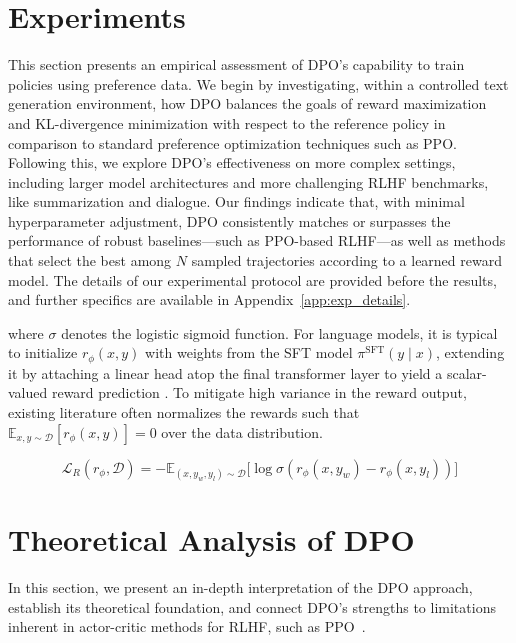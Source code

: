 \section{Experiments}
This section presents an empirical assessment of DPO’s capability to train policies using preference data. We begin by investigating, within a controlled text generation environment, how DPO balances the goals of reward maximization and KL-divergence minimization with respect to the reference policy in comparison to standard preference optimization techniques such as PPO. Following this, we explore DPO’s effectiveness on more complex settings, including larger model architectures and more challenging RLHF benchmarks, like summarization and dialogue. Our findings indicate that, with minimal hyperparameter adjustment, DPO consistently matches or surpasses the performance of robust baselines—such as PPO-based RLHF—as well as methods that select the best among $N$ sampled trajectories according to a learned reward model. The details of our experimental protocol are provided before the results, and further specifics are available in Appendix~\ref{app:exp_details}.

where $\sigma$ denotes the logistic sigmoid function. For language models, it is typical to initialize $r_{\phi}(x, y)$ with weights from the SFT model $\pi^\text{SFT}(y \mid x)$, extending it by attaching a linear head atop the final transformer layer to yield a scalar-valued reward prediction \cite{ziegler2020finetuning}. To mitigate high variance in the reward output, existing literature often normalizes the rewards such that $\mathbb{E}_{x,y\sim \mathcal{D}}\left[r_\phi(x, y)\right] = 0$ over the data distribution.

\begin{equation}\label{eq:reward_model}
    \mathcal{L}_R(r_{\phi}, \mathcal{D}) = -\mathbb{E}_{(x, y_w, y_l)\sim \mathcal{D}}\bigl[\log \sigma(r_{\phi}(x, y_w)- r_{\phi}(x, y_l))\bigr]
\end{equation}

\section{Theoretical Analysis of DPO} In this section, we present an in-depth interpretation of the DPO approach, establish its theoretical foundation, and connect DPO’s strengths to limitations inherent in actor-critic methods for RLHF, such as PPO~\cite{schulman2017proximal}.

\label{sec:theory}


